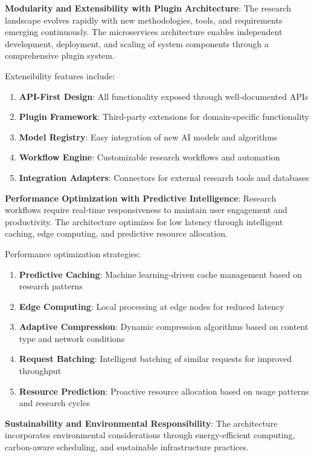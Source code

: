 \documentclass[10pt,twocolumn]{article}
\begin{document}
\textbf{Modularity and Extensibility with Plugin Architecture}: The research landscape evolves rapidly with new methodologies, tools, and requirements emerging continuously. The microservices architecture enables independent development, deployment, and scaling of system components through a comprehensive plugin system.

Extensibility features include:
\begin{enumerate}
    \item \textbf{API-First Design}: All functionality exposed through well-documented APIs
    \item \textbf{Plugin Framework}: Third-party extensions for domain-specific functionality
    \item \textbf{Model Registry}: Easy integration of new AI models and algorithms
    \item \textbf{Workflow Engine}: Customizable research workflows and automation
    \item \textbf{Integration Adapters}: Connectors for external research tools and databases
\end{enumerate}

\textbf{Performance Optimization with Predictive Intelligence}: Research workflows require real-time responsiveness to maintain user engagement and productivity. The architecture optimizes for low latency through intelligent caching, edge computing, and predictive resource allocation.

Performance optimization strategies:
\begin{enumerate}
    \item \textbf{Predictive Caching}: Machine learning-driven cache management based on research patterns
    \item \textbf{Edge Computing}: Local processing at edge nodes for reduced latency
    \item \textbf{Adaptive Compression}: Dynamic compression algorithms based on content type and network conditions
    \item \textbf{Request Batching}: Intelligent batching of similar requests for improved throughput
    \item \textbf{Resource Prediction}: Proactive resource allocation based on usage patterns and research cycles
\end{enumerate}

\textbf{Sustainability and Environmental Responsibility}: The architecture incorporates environmental considerations through energy-efficient computing, carbon-aware scheduling, and sustainable infrastructure practices.
\end{document}
